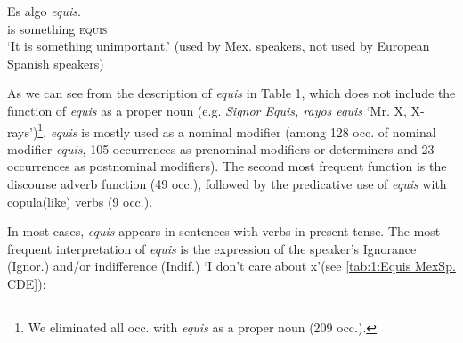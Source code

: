 \documentclass[output=paper]{langsci/langscibook}
\begin{document}
\ea \label{ex:kellert:8}
\gll Es algo \textit{equis}.\\
is something \textsc{equis}\\
\glt ‘It is something unimportant.’
(used by Mex. speakers, not used by European Spanish speakers)
\z

As we can see from the description of \textit{equis} in Table 1, which does not include the function of \textit{equis} as a proper noun (e.g. \textit{Signor Equis, rayos equis} ‘Mr. X, X-rays’)\footnote{We eliminated all occ. with \textit{equis} as a proper noun (209 occ.).}, \textit{equis} is mostly used as a nominal modifier (among 128 occ. of nominal modifier \textit{equis}, 105 occurrences as prenominal modifiers or determiners and 23 occurrences as postnominal modifiers). The second most frequent function is the discourse adverb function (49 occ.), followed by the predicative use of \textit{equis} with copula(like) verbs (9 occ.).

In most cases, \textit{equis} appears in sentences with verbs in present tense. The most frequent interpretation of \textit{equis} is the expression of the speaker’s Ignorance (Ignor.) and/or indifference (Indif.) ‘I don’t care about x’(see \ref{tab:1:Equis MexSp. CDE}):
\end{document}
